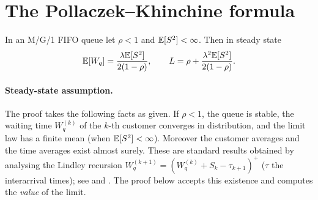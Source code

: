 \section{The Pollaczek--Khinchine formula}

\begin{theorem}\label{thm:pk}
In an M/G/1 FIFO queue let $\rho<1$ and $\mathbb{E}[S^2]<\infty$. Then in steady state
\begin{equation}\label{L3:eq:pk}
  \mathbb{E}[W_q]=\frac{\lambda\mathbb{E}[S^2]}{2(1-\rho)},\qquad
  L=\rho+\frac{\lambda^2\mathbb{E}[S^2]}{2(1-\rho)}.
\end{equation}
\end{theorem}

\paragraph{Steady-state assumption.} The proof takes the following facts as
given. If $\rho<1$, the queue is stable, the waiting time $W_q^{(k)}$ of the
$k$-th customer converges in distribution, and the limit law has a finite mean
(when $\mathbb{E}[S^2]<\infty$). Moreover the customer averages and the time averages
exist almost surely. These are standard results obtained by analysing the
Lindley recursion $W^{(k+1)}_q=(W^{(k)}_q+S_k-\tau_{k+1})^+$ ($\tau$ the
interarrival times); see \cite[Ch.~3, 10]{asmussen2003} and
\cite[Ch.~5]{kleinrock1975}. The proof below accepts this existence and computes
the \emph{value} of the limit.


